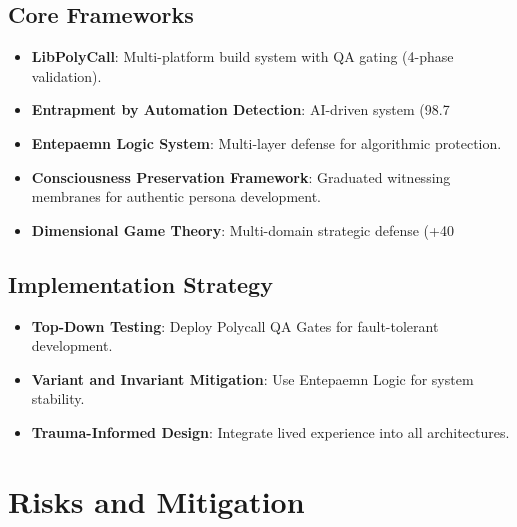\documentclass[12pt]{article}\usepackage[a4paper,margin=1in]{geometry}
\begin{document}
\subsection*{Core Frameworks}
\begin{itemize}
    \item \textbf{LibPolyCall}: Multi-platform build system with QA gating (4-phase validation).
    \item \textbf{Entrapment by Automation Detection}: AI-driven system (98.7%
    \item \textbf{Entepaemn Logic System}: Multi-layer defense for algorithmic protection.
    \item \textbf{Consciousness Preservation Framework}: Graduated witnessing membranes for authentic persona development.
    \item \textbf{Dimensional Game Theory}: Multi-domain strategic defense (+40%
\end{itemize}\subsection*{Implementation Strategy}
\begin{itemize}
    \item \textbf{Top-Down Testing}: Deploy Polycall QA Gates for fault-tolerant development.
    \item \textbf{Variant and Invariant Mitigation}: Use Entepaemn Logic for system stability.
    \item \textbf{Trauma-Informed Design}: Integrate lived experience into all architectures.
\end{itemize}\section*{Risks and Mitigation}
\end{document}

